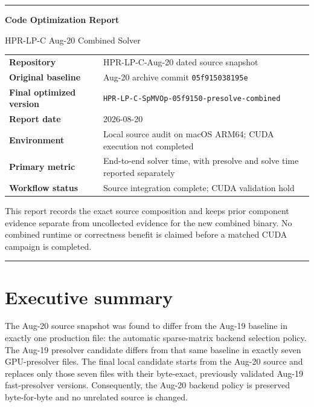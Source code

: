 \documentclass[10pt,a4paper]{article}
\newcommand{\ReportProject}{HPR-LP-C Aug-20 Combined Solver}
\newcommand{\ReportRepository}{HPR-LP-C-Aug-20 dated source snapshot}
\newcommand{\ReportBaseline}{Aug-20 archive commit \texttt{05f915038195e}}
\newcommand{\ReportCandidate}{\texttt{HPR-LP-C-SpMVOp-05f9150-presolve-combined}}
\newcommand{\ReportDate}{2026-08-20}
\newcommand{\ReportEnvironment}{Local source audit on macOS ARM64; CUDA execution not completed}
\newcommand{\ReportMetric}{End-to-end solver time, with presolve and solve time reported separately}
\newcommand{\ReportStatus}{Source integration complete; CUDA validation hold}
\begin{document}

\begin{titlepage}
\thispagestyle{empty}
\vspace*{18mm}
{\color{ReportBlue}\rule{\textwidth}{1.2pt}}\par
\vspace{12mm}
{\Huge\bfseries\color{ReportBlue}Code Optimization Report\par}
\vspace{4mm}
{\Large\ReportProject\par}
\vspace{15mm}

\begin{tabularx}{\textwidth}{@{}P{0.28\textwidth}Y@{}}
\textbf{Repository} & \ReportRepository\\
\textbf{Original baseline} & \ReportBaseline\\
\textbf{Final optimized version} & \ReportCandidate\\
\textbf{Report date} & \ReportDate\\
\textbf{Environment} & \ReportEnvironment\\
\textbf{Primary metric} & \ReportMetric\\
\textbf{Workflow status} & \ReportStatus\\
\end{tabularx}

\vfill
This report records the exact source composition and keeps prior component
evidence separate from uncollected evidence for the new combined binary.
No combined runtime or correctness benefit is claimed before a matched CUDA
campaign is completed.\par
\vspace{5mm}
{\color{ReportBlue}\rule{\textwidth}{1.2pt}}\par
\end{titlepage}

\tableofcontents
\thispagestyle{empty}
\clearpage
{}

\section{Executive summary}

The Aug-20 source snapshot was found to differ from the Aug-19 baseline in
exactly one production file: the automatic sparse-matrix backend selection
policy.  The Aug-19 presolver candidate differs from that same baseline in
exactly seven GPU-presolver files.  The final local candidate starts from the
Aug-20 source and replaces only those seven files with their byte-exact,
previously validated Aug-19 fast-presolver versions.  Consequently, the
Aug-20 backend policy is preserved byte-for-byte and no unrelated source is
changed.
\end{document}
